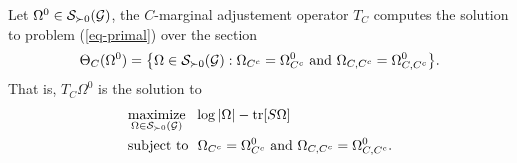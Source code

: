 \begin{lemma}
    Let $\Omega^0 \in {\mathcal{S}}_{\succ 0}({\mathcal{G}})$, the $C$-marginal adjustement operator $T_C$ computes the solution to problem (\ref{eq-primal}) over the section 
    \begin{equation*}
        \Theta_C(\Omega^0) = {\left\{ \Omega \in {\mathcal{S}}_{\succ 0}({\mathcal{G}}) : \Omega_{C^c} = \Omega^0_{C^c} {\textrm{ and }} \Omega_{C, C^c} = \Omega^0_{C, C^c} \right\}}.
    \end{equation*}
    That is, $T_C \Omega^0$ is the solution to
    \begin{align} \label{eq-sub-optim}
        \begin{split}
            &\underset{\Omega \in {\mathcal{S}}_{\succ 0}({\mathcal{G}})}{\textrm{maximize}}\ \  \log |\Omega| - {\textrm{tr}}[S\Omega]\\
            &\textrm{subject to}\ \ \Omega_{C^c} = \Omega^0_{C^c} {\textrm{ and }} \Omega_{C, C^c} = \Omega^0_{C, C^c}.
        \end{split}
    \end{align}
\end{lemma}

